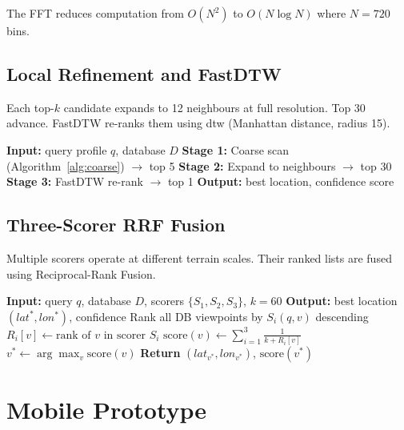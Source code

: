 \noindent The FFT reduces computation from $O(N^2)$ to $O(N \log N)$ where $N = 720$ bins.

\subsection{Local Refinement and FastDTW}

Each top-$k$ candidate expands to 12 neighbours at full resolution. Top 30 advance. FastDTW \cite{salvador2007fastdtw} re-ranks them using \Gls{dtw} (Manhattan distance, radius 15).

\begin{algorithm}[H]
\caption{Matching Pipeline}
\label{alg:matching}
\begin{algorithmic}[1]
\State \textbf{Input:} query profile $q$, database $D$
\State \textbf{Stage 1:} Coarse scan (Algorithm~\ref{alg:coarse}) $\to$ top 5
\State \textbf{Stage 2:} Expand to neighbours $\to$ top 30
\State \textbf{Stage 3:} FastDTW re-rank $\to$ top 1
\State \textbf{Output:} best location, confidence score
\end{algorithmic}
\end{algorithm}

\subsection{Three-Scorer RRF Fusion}

Multiple scorers operate at different terrain scales. Their ranked lists are fused using Reciprocal-Rank Fusion.

\begin{algorithm}[H]
\caption{Three-Scorer RRF Fusion}
\label{alg:rrf}
\begin{algorithmic}[1]
\State \textbf{Input:} query $q$, database $D$, scorers $\{S_1, S_2, S_3\}$, $k = 60$
\State \textbf{Output:} best location $(lat^*, lon^*)$, confidence
    \State Rank all DB viewpoints by $S_i(q, v)$ descending
    \State $R_i[v] \leftarrow \text{rank of } v \text{ in scorer } S_i$
\EndFor
{}
    \State $\text{score}(v) \leftarrow \sum_{i=1}^{3} \frac{1}{k + R_i[v]}$
\EndFor
\State $v^* \leftarrow \arg\max_v \text{score}(v)$
\State \textbf{Return} $(lat_{v^*}, lon_{v^*})$, $\text{score}(v^*)$
\end{algorithmic}
\end{algorithm}

\section{Mobile Prototype}

